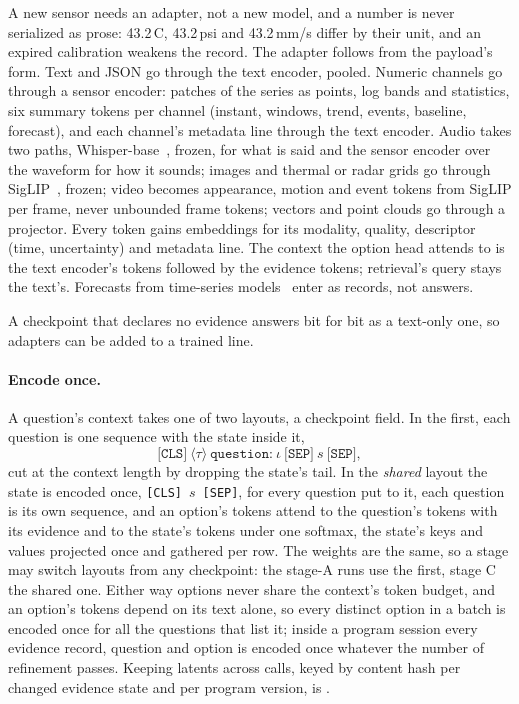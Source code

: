 A new sensor needs an adapter, not a new model, and a number is never serialized
as prose: 43.2\,\textdegree C, 43.2\,psi and 43.2\,mm/s differ by their unit,
and an expired calibration weakens the record. The adapter follows from the
payload's form. Text and JSON go through the text encoder, pooled. Numeric
channels go through a sensor encoder: patches of the series as points, log
bands and statistics, six summary tokens per channel (instant, windows, trend,
events, baseline, forecast), and each channel's metadata line through the text
encoder. Audio takes two paths, Whisper-base~\cite{radford2023whisper}, frozen,
for what is said and the sensor encoder over the waveform for how it sounds;
images and thermal or radar grids go through SigLIP~\cite{zhai2023siglip},
frozen; video becomes appearance, motion and event tokens from SigLIP per
frame, never unbounded frame tokens; vectors and point clouds go through a
projector. Every token gains embeddings for its modality, quality, descriptor
(time, uncertainty) and metadata line. The context the option head attends to
is the text encoder's tokens followed by the evidence tokens; retrieval's query
stays the text's. Forecasts from time-series
models~\cite{das2024timesfm,ansari2024chronos} enter as records, not answers.

A checkpoint that declares no evidence answers bit for bit as a text-only one,
so adapters can be added to a trained line.

\paragraph{Encode once.}
A question's context takes one of two layouts, a checkpoint field. In the
first, each question is one sequence with the state inside it,
\[
  \texttt{[CLS]}\ \langle\tau\rangle\ \texttt{question:}\ \iota\
  \texttt{[SEP]}\ s\ \texttt{[SEP]},
\]
cut at the context length by dropping the state's tail. In the \emph{shared}
layout the state is encoded once, \texttt{[CLS]}~$s$~\texttt{[SEP]}, for every
question put to it, each question is its own sequence, and an option's tokens
attend to the question's tokens with its evidence and to the state's tokens
under one softmax, the state's keys and values projected once and gathered per
row. The weights are the same, so a stage may switch layouts from any
checkpoint: the stage-A runs use the first, stage C the shared one. Either way
options never share the context's token budget, and an option's tokens depend
on its text alone, so every distinct option in a batch is encoded once for all
the questions that list it; inside a program session every evidence record,
question and option is encoded once whatever the number of refinement passes.
Keeping latents across calls, keyed by content hash per changed evidence state
and per program version, is \proposed.

